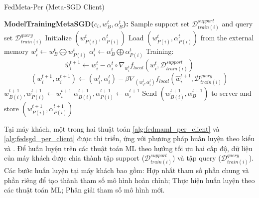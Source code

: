 \documentclass[runningheads]{llncs}
\begin{document}
\begin{algorithm}[h]
    \caption{FedMeta-Per (Meta-SGD Client)} \label{alg:fedsgd_per_client}
    \begin{algorithmic}[1]
        \State\textbf{ModelTrainingMetaSGD($c_i, w_B^t, \alpha_B^t$):}
        \State Sample support set $\mathcal{D}_{train(i)}^{support}$ and query set $\mathcal{D}_{train(i)}^{query}$
            \State Initialize $(w_{P(i)}^t, \alpha_{P(i)}^t)$
        \Else
            \State Load $(w_{P(i)}^t, \alpha_{P(i)}^t)$ from the external memory
        \EndIf
        \State $w_i^t \gets w_B^t \bigoplus w_{P(i)}^t$ 
        \State $\alpha_i^t \gets \alpha_B^t \bigoplus \alpha_{P(i)}^t$ 
        \State Training:
        \begin{dmath*}
            \hat{w}_{i}^{t+1} \gets w_{i}^t - \alpha_i^t\circ\nabla_{w_i^t} f_{local}\left(w_{i}^t, \mathcal{D}_{train(i)}^{support}\right)
        \end{dmath*}
        \begin{dmath*}
            (w_{i}^{t+1}, \alpha_i^{t+1}) \gets (w_{i}^t, \alpha_{i}^{t}) - \beta\nabla_{(w_i^t, \alpha_i^t)} f_{local}\left(\hat{w}_{i}^{t+1}, \mathcal{D}_{train(i)}^{query}\right)
        \end{dmath*}
        \State $w_{B(i)}^{t+1}, w_{P(i)}^{t+1} \gets w_i^{t+1}$ 
        \State $\alpha_{B(i)}^{t+1}, \alpha_{P(i)}^{t+1} \gets \alpha_i^{t+1}$ 
        \State Send $(w_{B(i)}^{t+1}, \alpha_B^{t+1})$ to server and store $(w_{P(i)}^{t+1}, \alpha_{P(i)}^{t+1})$
    \end{algorithmic}
\end{algorithm}

Tại máy khách, một trong hai thuật toán \ref{alg:fedmaml_per_client} và \ref{alg:fedsgd_per_client} được thi triển, ứng với phương pháp huấn luyện theo kiểu  và . Để huấn luyện trên các thuật toán ML theo hướng tối ưu hai cấp độ, dữ liệu của máy khách được chia thành tập support ($\mathcal{D}_{train(i)}^{support}$) và tập query ($\mathcal{D}_{train(i)}^{query}$). Các bước huấn luyện tại máy khách bao gồm: Hợp nhất tham số phần chung và phần riêng để tạo thành tham số mô hình hoàn chỉnh; Thực hiện huấn luyện theo các thuật toán ML; Phân giải tham số mô hình mới.
\end{document}

